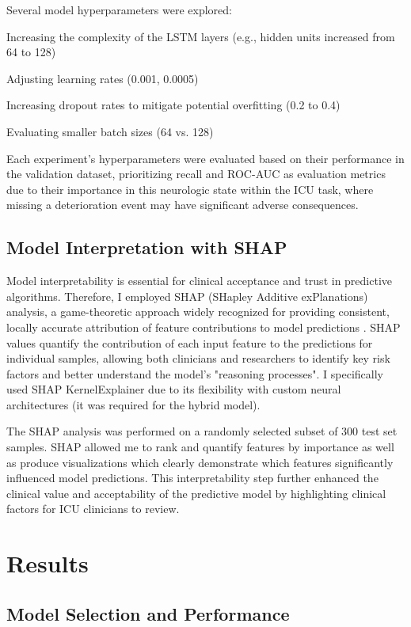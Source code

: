 \documentclass[conference]{IEEEtran}
\begin{document}
Several model hyperparameters were explored:

Increasing the complexity of the LSTM layers (e.g., hidden units increased from 64 to 128)

Adjusting learning rates (0.001, 0.0005)

Increasing dropout rates to mitigate potential overfitting (0.2 to 0.4)

Evaluating smaller batch sizes (64 vs. 128)

Each experiment's hyperparameters were evaluated based on their performance in the validation dataset, prioritizing recall and ROC-AUC as evaluation metrics due to their importance in this neurologic state within the ICU task, where missing a deterioration event may have significant adverse consequences.

\subsection{Model Interpretation with SHAP}

Model interpretability is essential for clinical acceptance and trust in predictive algorithms. Therefore, I employed SHAP (SHapley Additive exPlanations) analysis, a game-theoretic approach widely recognized for providing consistent, locally accurate attribution of feature contributions to model predictions \cite{lundberg2017unified}. SHAP values quantify the contribution of each input feature to the predictions for individual samples, allowing both clinicians and researchers to identify key risk factors and better understand the model's "reasoning processes". I specifically used SHAP KernelExplainer due to its flexibility with custom neural architectures (it was required for the hybrid model).

The SHAP analysis was performed on a randomly selected subset of 300 test set samples. SHAP allowed me to rank and quantify features by importance as well as produce visualizations which clearly demonstrate which features significantly influenced model predictions. This interpretability step further enhanced the clinical value and acceptability of the predictive model by highlighting clinical factors for ICU clinicians to review.

\section{Results}

\subsection{Model Selection and Performance}
\end{document}
